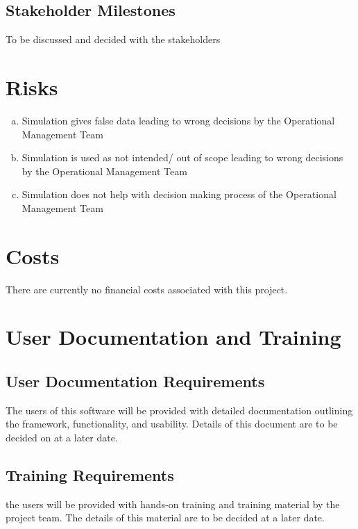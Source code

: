 \documentclass[paper=letter, fontsize=10pt]{scrartcl}
\numberwithin{equation}{section}		%
\numberwithin{figure}{section}			%
\numberwithin{table}{section}				%
\begin{document}
\subsection{Stakeholder Milestones}
To be discussed and decided with the stakeholders
\section{Risks}
\begin{enumerate}[(a)]
	\item Simulation gives false data leading to wrong decisions by the Operational Management Team
	\item Simulation is used as not intended/ out of scope leading to wrong decisions by the Operational Management Team
	\item Simulation does not help with decision making process of the Operational Management Team 
\end{enumerate}
\section{Costs}
There are currently no financial costs associated with this project.

\section{User Documentation and Training}
\subsection{User Documentation Requirements}
The users of this software will be provided with detailed documentation outlining the framework, functionality, and usability. Details of this document are to be decided on at a later date.
\subsection{Training Requirements}
the users will be provided with hands-on training and training material by the project team. The details of this material are to be decided at a later date. 
\end{document}
